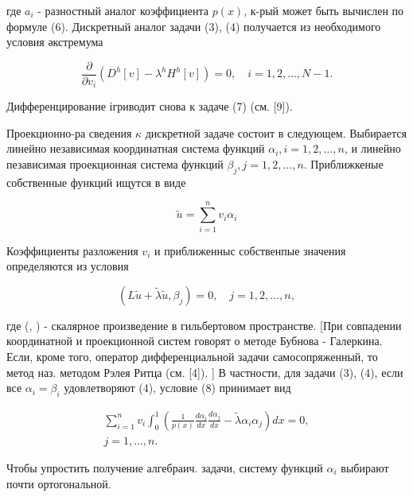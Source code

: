 \documentclass[10pt]{article}
\begin{document}
где $a_{i}$ - разностный аналог коэффициента $p(x)$, к-рый может быть вычислен по формуле (6). Дискретный аналог задачи (3), (4) получается из необходимого условия әкстремума



\[

\frac{\partial}{\partial v_{i}}\left(D^{h}[v]-\lambda^{h} H^{h}[v]\right)=0, \quad i=1,2, \ldots, N-1 .

\]



Дифференцирование ігриводит снова к задаче (7) (см. [9]).



Проекционно-ра сведения $\kappa$ дискретной задаче состоит в следующем. Выбирается линейно независимая координатная система функций $\alpha_{i}, i=1,2, \ldots, n$, и линейно пезависимая проекционная система функций $\beta_{j}, j=1,2, \ldots, n$. Приближкеные собственные функций ищутся в виде



\[

\tilde{u}=\sum_{i=1}^{n} v_{i} \alpha_{i}

\]



Коэффициенты разложения $v_{i}$ и приближенныс собственпые значения определяются из условия



\[

\left(L \tilde{u}+\tilde{\lambda} \tilde{u}, \beta_{j}\right)=0, \quad j=1,2, \ldots, n,

\]



где (, ) - скалярное произведение в гильбертовом пространстве. [При совпадении координатной и проекционной систем говорят о методе Бубнова - Галеркина. Если, кроме того, оператор дифференциальной задачи самосопряженный, то метод наз. методом Рэлея Ритца (см. [4]). ] В частности, для задачи (3), (4), если все $\alpha_{i}=\beta_{i}$ удовлетворяют (4), условие (8) принимает вид



\[

\begin{gathered}

\sum_{i=1}^{n} v_{i} \int_{0}^{1}\left(\frac{1}{p(x)} \frac{d \alpha_{i}}{d x} \frac{d \alpha_{j}}{d x}-\tilde{\lambda} \alpha_{i} \alpha_{j}\right) d x=0, \\

j=1, \ldots, n .

\end{gathered}

\]



Чтобы упростить получение алгебраич. задачи, систему функций $\alpha_{i}$ выбирают почти ортогональной.
\end{document}
